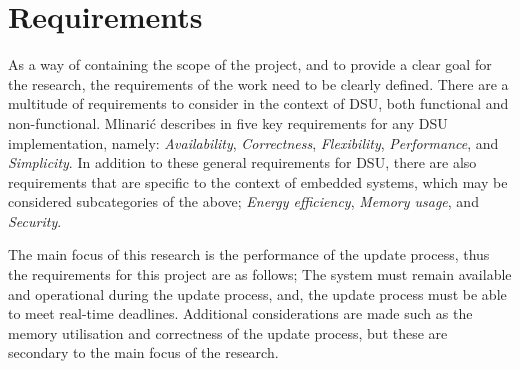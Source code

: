 \section{Requirements}
As a way of containing the scope of the project, and to provide a clear goal for the research, the requirements of the work need to be clearly defined. There are a multitude of requirements to consider in the context of DSU, both functional and non-functional. Mlinarić describes in \cite{dsuChallenges} five key requirements for any DSU implementation, namely: \textit{Availability}, \textit{Correctness}, \textit{Flexibility}, \textit{Performance}, and \textit{Simplicity}. In addition to these general requirements for DSU, there are also requirements that are specific to the context of embedded systems, which may be considered subcategories of the above; \textit{Energy efficiency}, \textit{Memory usage}, and \textit{Security}.

The main focus of this research is the performance of the update process, thus the requirements for this project are as follows; The system must remain available and operational during the update process, and, the update process must be able to meet real-time deadlines. Additional considerations are made such as the memory utilisation and correctness of the update process, but these are secondary to the main focus of the research.

